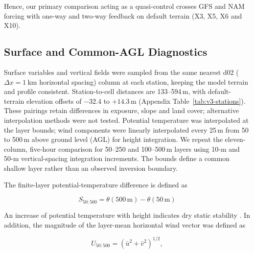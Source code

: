 \documentclass[air,article,submit,moreauthors]{Definitions/mdpi}
\begin{document}

Hence, our primary comparison acting as a quasi-control crosses GFS and NAM forcing with one-way and two-way feedback on default terrain (X3, X5, X6 and X10).

\subsection{Surface and Common-AGL Diagnostics}
\label{sec:v3-common-agl}

Surface variables and vertical fields were sampled from the same nearest d02 ($\Delta x = 1~\text{km}$ horizontal spacing) column at each station, keeping the model terrain and profile consistent.
Station-to-cell distances are 133--594\,m, with default-terrain elevation offsets of $-32.4$ to $+14.3$\,m (Appendix Table~\ref{tab:v3-stations}).
These pairings retain differences in exposure, slope and land cover; alternative interpolation methods were not tested.
Potential temperature was interpolated at the layer bounds; wind components were linearly interpolated every 25\,m from 50 to 500\,m above ground level (AGL) for height integration.
We repeat the eleven-column, five-hour comparison for 50--250 and 100--500\,m layers using 10-m and 50-m vertical-spacing integration increments.
The bounds define a common shallow layer rather than an observed inversion boundary.

The finite-layer potential-temperature difference is defined as

\begin{equation}
S_{50:500}=\theta(500\,\mathrm{m})-\theta(50\,\mathrm{m})
\end{equation}

An increase of potential temperature with height indicates dry static stability \citep{WallaceHobbs2006,Stull1988}.
In addition, the magnitude of the layer-mean horizontal wind vector was defined as

\begin{equation}
U_{50:500}=\left(\bar{u}^{2}+\bar{v}^{2}\right)^{1/2},
\end{equation}
\end{document}
